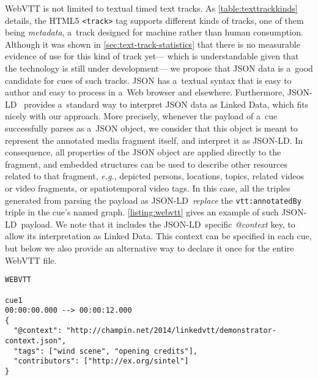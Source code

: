 \documentclass{sig-alternate-ceur}
\newcommand{\vtt}[1]{\texttt{vtt:#1}}
\def\JSONLD{\mbox{JSON-LD}}
\begin{document}
WebVTT is not limited to textual timed text tracks.
As \autoref{table:texttrackkinds} details, the HTML5
\texttt{<track>} tag supports different kinds of tracks,
one of them being \textit{metadata},
a~track designed for machine rather than human consumption.
Although it was shown in \autoref{sec:text-track-statistics}
that there is no measurable evidence of use for this kind of track yet---%
which is understandable given that the technology
is still under development---%
we propose that JSON data is a~good candidate for cues of such tracks.
JSON has a~textual syntax that is easy to author
and easy to process in a~Web browser and elsewhere.
Furthermore, \JSONLD~\cite{sporny2013jsonld} provides
a~standard way to interpret JSON data as Linked Data,
which fits nicely with our approach.
More precisely, whenever the payload of a~cue
successfully parses as a~JSON object,
we consider that this object is meant to
represent the annotated media fragment itself,
and interpret it as \JSONLD.
In consequence, all properties of the JSON object
are applied directly to the fragment,
and embedded structures can be used to describe
other resources related to that fragment,
\emph{e.g.}, depicted persons, locations, topics, related videos
or video fragments, or spatiotemporal video tags.
In this case, all the triples generated from parsing the payload as \JSONLD\
\emph{replace} the \vtt{annotatedBy} triple in the cue's named graph.
\autoref{listing:webvtt} gives an example of such \JSONLD\ payload.
We note that it includes the \JSONLD\ specific \emph{@context} key,
to allow its interpretation as Linked Data.
This context can be specified in each cue,
but below we also provide an alternative way to declare it once
for the entire WebVTT file.

\begin{comment}
\begin{lstlisting}[caption={A~WebVTT cue with a~\JSONLD\ payload},
  label=listing:jsonld-payload, float=t!]
00:00:00.000 --> 00:00:12.000
{
  "label": "Vince and Jules in the car",
  "depicts": [
    {
      "@id": "http://wikidata.org/entity/Q80938",
      "name": "John Travolta"
    },
    {
      "@id": "http://wikidata.org/entity/Q172678",
      "name": "Samuel L. Jackson"
    }
  ]
}
\end{lstlisting}
\end{comment}

\begin{lstlisting}[caption={Sample WebVTT metadata file with \JSONLD\
  payload in a~cue identified as ``cue1''},
  label=listing:webvtt, float=t!]
WEBVTT

cue1
00:00:00.000 --> 00:00:12.000
{
  "@context": "http://champin.net/2014/linkedvtt/demonstrator-context.json",
  "tags": ["wind scene", "opening credits"],
  "contributors": ["http://ex.org/sintel"]
}
\end{lstlisting}
\end{document}
